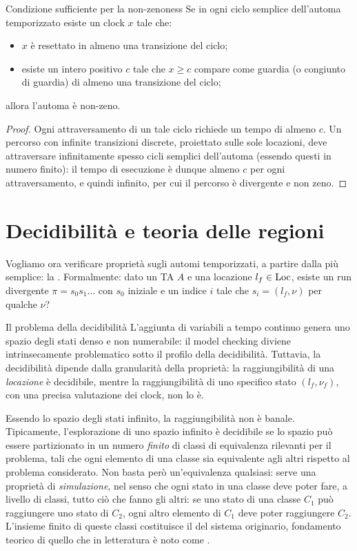 \begin{proposition}{Condizione sufficiente per la non-zenoness}
  Se in ogni ciclo semplice dell'automa temporizzato esiste un clock \(x\) tale che:
  \begin{itemize}
    \item \(x\) è resettato in almeno una transizione del ciclo;
    \item esiste un intero positivo \(c\) tale che \(x \geq c\) compare come guardia (o congiunto di guardia) di almeno una transizione del ciclo;
  \end{itemize}
  allora l'automa è non-zeno.
\end{proposition}
\begin{proof}
  Ogni attraversamento di un tale ciclo richiede un tempo di almeno \(c\). Un percorso con infinite transizioni discrete, proiettato sulle sole locazioni, deve attraversare infinitamente spesso cicli semplici dell'automa (essendo questi in numero finito): il tempo di esecuzione è dunque almeno \(c\) per ogni attraversamento, e quindi infinito, per cui il percorso è divergente e non zeno.
\end{proof}

\section{Decidibilità e teoria delle regioni}

Vogliamo ora verificare proprietà sugli automi temporizzati, a partire dalla più semplice: la . Formalmente: dato un TA \(A\) e una locazione \(l_f \in \operatorname{Loc}\), esiste un run divergente \(\pi = s_0 s_1 \ldots\) con \(s_0\) iniziale e un indice \(i\) tale che \(s_i = (l_f, \nu)\) per qualche \(\nu\)?

\begin{observation}{Il problema della decidibilità}
  L'aggiunta di variabili a tempo continuo genera uno spazio degli stati denso e non numerabile: il model checking diviene intrinsecamente problematico sotto il profilo della decidibilità. Tuttavia, la decidibilità dipende dalla granularità della proprietà: la raggiungibilità di una \emph{locazione} è decidibile, mentre la raggiungibilità di uno specifico stato \((l_f,\nu_f)\), con una precisa valutazione dei clock, non lo è.
\end{observation}

Essendo lo spazio degli stati infinito, la raggiungibilità non è banale. Tipicamente, l'esplorazione di uno spazio infinito è decidibile se lo spazio può essere partizionato in un numero \emph{finito} di classi di equivalenza rilevanti per il problema, tali che ogni elemento di una classe sia equivalente agli altri rispetto al problema considerato. Non basta però un'equivalenza qualsiasi: serve una proprietà di \emph{simulazione}, nel senso che ogni stato in una classe deve poter fare, a livello di classi, tutto ciò che fanno gli altri: se uno stato di una classe \(C_1\) può raggiungere uno stato di \(C_2\), ogni altro elemento di \(C_1\) deve poter raggiungere \(C_2\). L'insieme finito di queste classi costituisce il  del sistema originario, fondamento teorico di quello che in letteratura è noto come .

